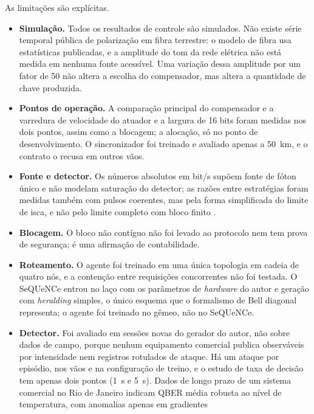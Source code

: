 \documentclass[12pt]{article}
\begin{document}
As limitações são explícitas.
\begin{itemize}
  \item \textbf{Simulação.} Todos os resultados de controle são simulados. Não
        existe série temporal pública de polarização em fibra terrestre: o
        modelo de fibra usa estatísticas publicadas, e a amplitude do tom da
        rede elétrica não está medida em nenhuma fonte acessível. Uma variação
        dessa amplitude por um fator de 50 não altera a escolha do compensador,
        mas altera a quantidade de chave produzida.
  \item \textbf{Pontos de operação.} A comparação principal do compensador e
        a varredura de velocidade do atuador e a largura de 16 bits foram
        medidas nos dois pontos, assim como a blocagem; a alocação, só no ponto de
        desenvolvimento. O sincronizador foi treinado e avaliado apenas a
        50~km, e o contrato o recusa em outros vãos.
  \item \textbf{Fonte e detector.} Os números absolutos em bit/s supõem fonte de
        fóton único e não modelam saturação do detector; as razões entre
        estratégias foram medidas também com pulsos coerentes, mas pela forma
        simplificada do limite de isca, e não pelo limite completo com bloco
        finito \cite{lim2014}.
  \item \textbf{Blocagem.} O bloco não contíguo não foi levado ao protocolo nem
        tem prova de segurança; é uma afirmação de contabilidade.
  \item \textbf{Roteamento.} O agente foi treinado em uma única topologia em
        cadeia de quatro nós, e a contenção entre requisições concorrentes não
        foi testada. O SeQUeNCe entrou no laço com os parâmetros de
        \textit{hardware} do autor e geração com \textit{heralding} simples, o
        único esquema que o formalismo de Bell diagonal representa; o agente foi
        treinado no gêmeo, não no SeQUeNCe.
  \item \textbf{Detector.} Foi avaliado em sessões novas do gerador do autor,
        não sobre dados de campo, porque nenhum equipamento comercial publica
        observáveis por intensidade nem registros rotulados de ataque. Há um
        ataque por episódio, nos vãos e na configuração de treino, e o estudo de
        taxa de decisão tem apenas dois pontos (1~s e 5~s). Dados de longo prazo de um
        sistema comercial no Rio de Janeiro \cite{tezzin2026} indicam QBER média
        robusta ao nível de temperatura, com anomalias apenas em gradientes

\end{itemize}
\end{document}
